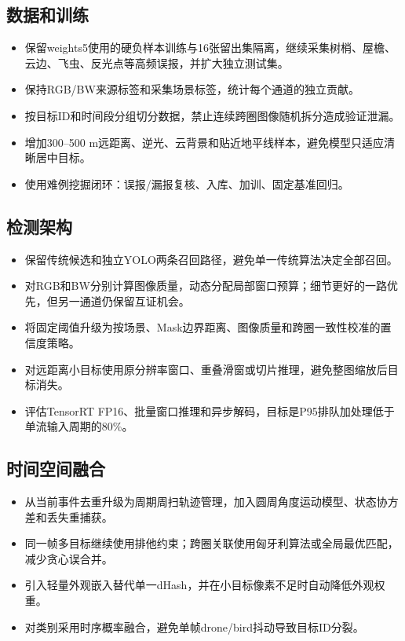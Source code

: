 \documentclass[UTF8,a4paper,11pt,openany]{ctexrep}
\begin{document}
\subsection{数据和训练}

\begin{itemize}
  \item 保留weights5使用的硬负样本训练与16张留出集隔离，继续采集树梢、屋檐、云边、飞虫、反光点等高频误报，并扩大独立测试集。
  \item 保持RGB/BW来源标签和采集场景标签，统计每个通道的独立贡献。
  \item 按目标ID和时间段分组切分数据，禁止连续跨圈图像随机拆分造成验证泄漏。
  \item 增加300--500 m远距离、逆光、云背景和贴近地平线样本，避免模型只适应清晰居中目标。
  \item 使用难例挖掘闭环：误报/漏报复核、入库、加训、固定基准回归。
\end{itemize}

\subsection{检测架构}

\begin{itemize}
  \item 保留传统候选和独立YOLO两条召回路径，避免单一传统算法决定全部召回。
  \item 对RGB和BW分别计算图像质量，动态分配局部窗口预算；细节更好的一路优先，但另一通道仍保留互证机会。
  \item 将固定阈值升级为按场景、Mask边界距离、图像质量和跨圈一致性校准的置信度策略。
  \item 对远距离小目标使用原分辨率窗口、重叠滑窗或切片推理，避免整图缩放后目标消失。
  \item 评估TensorRT FP16、批量窗口推理和异步解码，目标是P95排队加处理低于单流输入周期的80\%。
\end{itemize}

\subsection{时间空间融合}

\begin{itemize}
  \item 从当前事件去重升级为周期周扫轨迹管理，加入圆周角度运动模型、状态协方差和丢失重捕获。
  \item 同一帧多目标继续使用排他约束；跨圈关联使用匈牙利算法或全局最优匹配，减少贪心误合并。
  \item 引入轻量外观嵌入替代单一dHash，并在小目标像素不足时自动降低外观权重。
  \item 对类别采用时序概率融合，避免单帧drone/bird抖动导致目标ID分裂。
\end{itemize}
\end{document}
